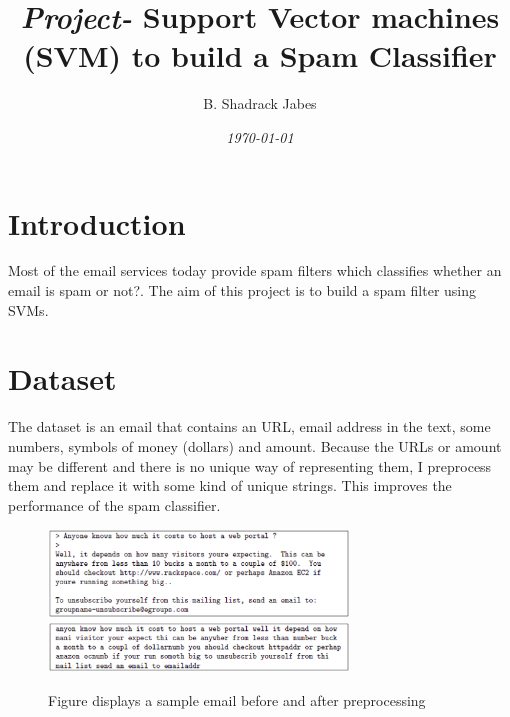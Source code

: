 \documentclass[twocolumn]{article}
\title {{\it Project-} Support Vector machines (SVM) to build a Spam Classifier}
\author{B. Shadrack Jabes}
\date{\it{\today}}
\begin{document}
\maketitle

\section{Introduction}
Most of the email services today provide spam filters which classifies whether an email is spam or not?.
The aim of this project is to build a spam filter using SVMs.

\section{Dataset}
The dataset is an email that contains an URL, email address in the text, some numbers, symbols of money (dollars) and amount. Because the URLs or amount may be different and there is no unique way of representing them, I preprocess them  and replace it with some kind of unique strings. This improves the performance of the spam classifier.
	   \begin{figure}[htbp]
                \centering
                \includegraphics[clip=true,trim=0cm 0cm 0cm 0cm,width=8cm]{../sampleemail1.ps}\\
                \includegraphics[clip=true,trim=0cm 0cm 0cm 0cm,width=8cm]{../sampleemail2.ps}\\
                        \caption{Figure displays a sample email before and after preprocessing}
                \label{fig:dataset}
                \end{figure}
\end{document}
